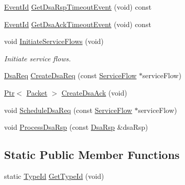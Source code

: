 \begin{DoxyCompactItemize}
\hyperlink{classns3_1_1EventId}{Event\+Id} \hyperlink{classns3_1_1SsServiceFlowManager_a6c0821003d364f542c4b06988a1b3e2a}{Get\+Dsa\+Rsp\+Timeout\+Event} (void) const 
\item 
\hyperlink{classns3_1_1EventId}{Event\+Id} \hyperlink{classns3_1_1SsServiceFlowManager_ac8d7de6fa1325b0033fc1b8d76a19bb2}{Get\+Dsa\+Ack\+Timeout\+Event} (void) const 
\item 
void \hyperlink{classns3_1_1SsServiceFlowManager_a8cc3878dd2f5b51c1d25624117072257}{Initiate\+Service\+Flows} (void)
\begin{DoxyCompactList}\small\item\em Initiate service flows. \end{DoxyCompactList}\item 
\hyperlink{classns3_1_1DsaReq}{Dsa\+Req} \hyperlink{classns3_1_1SsServiceFlowManager_a7adde8a20398dd4602777ca8ff64a4e9}{Create\+Dsa\+Req} (const \hyperlink{classns3_1_1ServiceFlow}{Service\+Flow} $\ast$service\+Flow)
\item 
\hyperlink{classns3_1_1Ptr}{Ptr}$<$ \hyperlink{classns3_1_1Packet}{Packet} $>$ \hyperlink{classns3_1_1SsServiceFlowManager_aa1284d53599ef6f1c4ba3f7dd3ac8f09}{Create\+Dsa\+Ack} (void)
\item 
void \hyperlink{classns3_1_1SsServiceFlowManager_a052a9d96dea7f79a7408d19a9a20b875}{Schedule\+Dsa\+Req} (const \hyperlink{classns3_1_1ServiceFlow}{Service\+Flow} $\ast$service\+Flow)
\item 
void \hyperlink{classns3_1_1SsServiceFlowManager_a0d610f8ac8628def7125bfcf32e8b3c1}{Process\+Dsa\+Rsp} (const \hyperlink{classns3_1_1DsaRsp}{Dsa\+Rsp} \&dsa\+Rsp)
\end{DoxyCompactItemize}
\subsection*{Static Public Member Functions}
\begin{DoxyCompactItemize}
\item 
static \hyperlink{classns3_1_1TypeId}{Type\+Id} \hyperlink{classns3_1_1SsServiceFlowManager_a8c469e675c545a3630c5fdb9bf119e9a}{Get\+Type\+Id} (void)
\end{DoxyCompactItemize}
